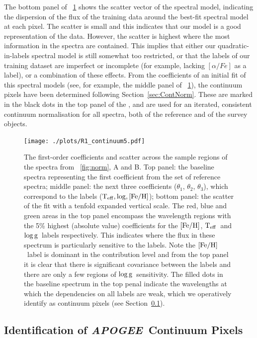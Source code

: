 \documentclass[12pt, preprint]{aastex}
\newcommand{\sectionname}{Section}
\newcommand{\apogee}{\textsl{APOGEE}}
\newcommand{\teff}{\mbox{$\rm T_{eff}$}}
\newcommand{\feh}{\mbox{$\rm [Fe/H]$}}
\newcommand{\logg}{\mbox{$\rm \log g$}}
\begin{document}
The bottom panel of \figurename~\ref{fig:coeffs} shows the scatter vector of the spectral model, 
indicating the dispersion of the flux of the training data around the best-fit spectral model at each pixel. 
The scatter is small and this indicates that our model is a good representation of the data. 
However, the scatter is highest where the most information in the spectra are contained. 
This implies that either our quadratic-in-labels spectral model is still somewhat too restricted, or that the labels of our training dataset are imperfect or incomplete 
(for example, lacking $[\alpha / Fe]$ as a label), or a combination of these effects. 
From the coefficients of an initial fit of this spectral models (see, for example, the middle panel of \figurename~\ref{fig:coeffs}), 
the continuum pixels have been determined following \sectionname~\ref{sec:ContNorm}. 
These are marked in the black dots in the top panel of the \figurename, and are used for an iterated, 
consistent continuum normalisation for all spectra, both of the reference and of the survey objects.

\begin{figure}[h!]
\centering
    \texttt{[image: ./plots/R1\_continuum5.pdf]}
  \caption{The first-order coefficients and scatter across the sample regions of the spectra from \figurename~\ref{fig:norm}, A and B. Top panel: the baseline spectra representing the first coefficient from the set of reference spectra; middle panel: the next three coefficients ($\theta_1$, $\theta_2$, $\theta_3$),  which correspond to the labels ($\teff, \log, \feh$); bottom panel: the scatter of the fit with a tenfold expanded vertical scale.  The red, blue and green areas in the top panel encompass the wavelength regions with the 5\% highest (absolute value) coefficients for the \feh, \teff\ and \logg\ labels respectively. This indicates where the flux in these spectrum is particularly sensitive to the labels.  Note the \feh\ label is dominant in the contribution level and from the top panel it is clear that there is significant covariance between the labels and there are only a few regions of \logg\ sensitivity. The filled dots in the baseline spectrum in the top penal indicate the wavelengths at which the dependencies on all labels are weak, which we operatively identify as continuum pixels (see \sectionname~\ref{sec:ApogeeContinuum}).}
\label{fig:coeffs}
\end{figure}

\subsection{Identification of \apogee\ Continuum Pixels}
\label{sec:ApogeeContinuum}
\end{document}
